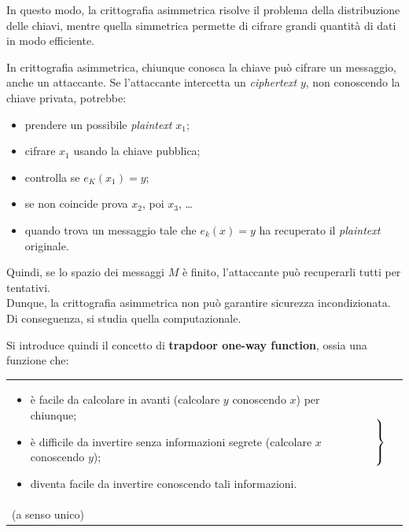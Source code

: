 In questo modo, la crittografia asimmetrica risolve il problema della distribuzione delle chiavi, mentre quella simmetrica permette di cifrare grandi quantità di dati in modo efficiente.

\vspace{2em} In crittografia asimmetrica, chiunque conosca la chiave può cifrare un messaggio, anche un attaccante. Se l'attaccante intercetta un \textit{ciphertext} $y$, non conoscendo la chiave privata, potrebbe:
\begin{itemize}
    \item prendere un possibile \textit{plaintext} $x_1$;
    \item cifrare $x_1$ usando la chiave pubblica;
    \item controlla se $e_K(x_1)=y$;
    \item se non coincide prova $x_2$, poi $x_3$, \dots
    \item quando trova un messaggio tale che $e_k(x)=y$ ha recuperato il \textit{plaintext} originale. 
\end{itemize}

Quindi, se lo spazio dei messaggi $M$ è finito, l'attaccante può recuperarli tutti per tentativi. \\ Dunque, la crittografia asimmetrica non può garantire sicurezza incondizionata. \\ Di conseguenza, si studia quella computazionale.  

\vspace{2em} Si introduce quindi il concetto di \textbf{trapdoor one-way
function}, ossia una funzione che:

\noindent
\begin{tabular}{@{}l@{\hspace{3pt}}l@{\hspace{5pt}}l@{}}
\begin{minipage}{0.76\linewidth}
    \vspace{0.5em}
\begin{itemize}
    \item è facile da calcolare in avanti (calcolare $y$ conoscendo $x$)
    per chiunque;
    \item è difficile da invertire senza informazioni segrete
    (calcolare $x$ conoscendo $y$);
    \item diventa facile da invertire conoscendo tali informazioni.
\end{itemize}
\end{minipage}
&
$\left.\rule{0pt}{2.5em}\right\}$
&
\begin{minipage}{0.18\linewidth}
\textbf{Funzione one-way}\\
(a senso unico)
\end{minipage}
\end{tabular}


